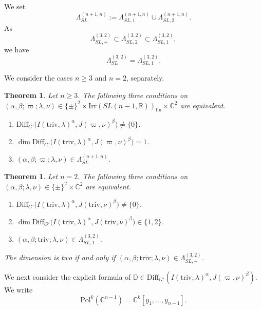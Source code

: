 \documentclass[reqno,11pt]{amsart}
\newtheorem{thm}[equation]{Theorem}
\theoremstyle{remark}
\theoremstyle{definition}
\numberwithin{equation}{section}
\newcommand{\gb}{\beta}
\newcommand{\ga}{\alpha}
\newcommand{\gL}{\Lambda}
\newcommand{\R}{\mathbb{R}}
\newcommand{\C}{\mathbb{C}}
\newcommand{\Pol}{\mathrm{Pol}}
\newcommand{\Diff}{\mathrm{Diff}}
\newcommand{\Irr}{\mathrm{Irr}}
\newcommand{\triv}{\mathrm{triv}}
\newcommand{\fin}{\mathrm{fin}}
\newcommand{\bD}{\mathbb{D}}
\begin{document}
We set
\begin{equation}\label{eqn:SL}
\gL^{(n+1,n)}_{SL}:=\gL^{(n+1,n)}_{SL,1} \cup \gL^{(n+1,n)}_{SL,2}.
\end{equation}
As
\begin{equation*}
\gL^{(3,2)}_{SL,+} \subset \gL^{(3,2)}_{SL,2} \subset \gL^{(3,2)}_{SL,1},
\end{equation*}
we have 
\begin{equation*}
\gL^{(3,2)}_{SL}=\gL^{(3,2)}_{SL,1}.
\end{equation*}

We consider the cases $n\geq 3$ and $n=2$, separately.

\begin{thm}%
\label{thm:DSBO1a}
Let $n\geq 3$.
The following three conditions on
 $(\alpha,\beta; \varpi; \lambda, \nu) 
\in \{\pm\}^2\times \Irr(SL(n-1,\R))_{\fin} \times \C^2 $ are 
equivalent.
\begin{enumerate}
\item[\emph{(i)}] 
$\Diff_{G'}\big(I(\triv, \lambda)^\alpha, J(\varpi, \nu)^\beta) \neq \{0\}$.
\item[\emph{(ii)}] $\dim \Diff_{G'}\big(I(\triv, \lambda)^\alpha, J(\varpi, \nu)^\beta) =1 $.
\item[\emph{(iii)}] 
$(\alpha,\beta; \varpi; \lambda, \nu) \in \gL^{(n+1,n)}_{SL}$.
\end{enumerate}
\end{thm}


\begin{thm}%
\label{thm:DSBO1b}
Let $n=2$.
The following three conditions on
 $(\alpha,\beta;\lambda, \nu) \in \{\pm\}^2\times \C^2 $ are 
equivalent.
\begin{enumerate}
\item[\emph{(i)}] 
$\Diff_{G'}\big(I(\triv, \lambda)^\alpha, J(\triv, \nu)^\beta\big) \neq \{0\}$.
\item[\emph{(ii)}] 
$\dim \Diff_{G'}\big(I(\triv, \lambda)^\alpha, J(\triv, \nu)^\beta\big) \in \{1,2\} $.
\item[\emph{(iii)}] 
$(\alpha,\beta; \triv; \lambda, \nu) \in \gL^{(3,2)}_{SL,1}$.
\end{enumerate}
The dimension is two if and only if 
$(\alpha,\beta; \triv; \lambda, \nu) \in \gL^{(3,2)}_{SL,+}$.
\end{thm}

We next consider the explicit formula of 
$\bD \in \Diff_{G'}(I(\triv, \lambda)^\ga, J(\varpi, \nu)^\gb)$.
We write
\begin{equation*}
\Pol^k(\C^{n-1}) = \C^k[y_1,\ldots, y_{n-1}].
\end{equation*}
\end{document}
